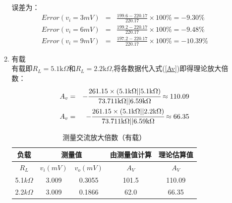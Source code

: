 \documentclass[a4paper]{article}
\begin{document}
\begin{enumerate}
\begin{enumerate}
误差为：
\begin{eqnarray}
Error(v_i=3mV) &=& \frac{199.6-220.17}{220.17}\times 100\% = -9.30\%\\
Error(v_i=6mV) &=& \frac{199.2-220.17}{220.17}\times 100\% = -9.48\%\\
Error(v_i=9mV) &=& \frac{197.2-220.17}{220.17}\times 100\% = -10.39\%
\end{eqnarray}
\item 有载\\
有载即$R_L = 5.1\text{k}\Omega$和$R_L = 2.2\text{k}\Omega$,将各数据代入式(\ref{Av})即得理论放大倍数：
\begin{eqnarray}
A_v &=& -\cfrac{261.15\times(5.1\text{k}\Omega || 5.1\text{k}\Omega)}{73.711\text{k}\Omega || 6.59\text{k}\Omega} \approx 110.09\\
A_v &=& -\cfrac{261.15\times(5.1\text{k}\Omega || 2.2\text{k}\Omega)}{73.711\text{k}\Omega || 6.59\text{k}\Omega} \approx 66.35
\end{eqnarray}
\begin{table}[!h]
\centering
\caption{测量交流放大倍数（有载）}
\label{table4}
\begin{tabular}{c|c|c|c|c}
\hline
负载           & \multicolumn{2}{c|}{测量值}                 & 由测量值计算 & 理论估算值 \\ \hline
$R_L$        & $v_i(mV)$ & $v_o(mV)$ & $A_V$  & $A_V$ \\ \hline
5.1$k\Omega$ & 3.009 & 0.3055        & 101.5    & 110.09      \\ \hline
2.2$k\Omega$ & 3.009 & 0.1866        & 62.0      & 66.35     \\ \hline
\end{tabular}
\end{table}


\end{enumerate}
\end{enumerate}
\end{document}
